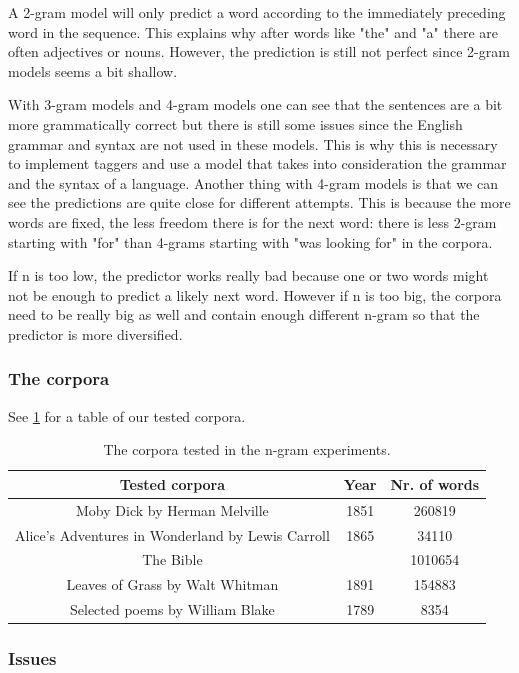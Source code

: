 \documentclass[a4paper,12pt]{article}
\begin{document}
A 2-gram model will only predict a word according to the immediately preceding word in the sequence. This explains why after words like "the" and "a" there are often adjectives or nouns. However, the prediction is still not perfect since 2-gram models seems a bit shallow.

With 3-gram models and 4-gram models one can see that the sentences are a bit more grammatically correct but there is still some issues since the English grammar and syntax are not used in these models. This is why this is necessary to implement taggers and use a model that takes into consideration the grammar and the syntax of a language. Another thing with 4-gram models is that we can see the predictions are quite close for different attempts. This is because the more words are fixed, the less freedom there is for the next word: there is less 2-gram starting with "for" than 4-grams starting with "was looking for" in the corpora.
	
If n is too low, the predictor works really bad because one or two words might not be enough to predict a likely next word. However if n is too big, the corpora need to be really big as well and contain enough different n-gram so that the predictor is more diversified.

\subsubsection{The corpora}
See \ref{tab:corpora1} for a table of our tested corpora.
\begin{table}
\begin{center}
\begin{tabular}{|c|c|c|}
\hline
Tested corpora & Year & Nr. of words \\ \hline
Moby Dick by Herman Melville & 1851 & 260819\\ \hline
Alice's Adventures in Wonderland by Lewis Carroll & 1865 & 34110 \\ \hline
The Bible & & 1010654 \\ \hline
Leaves of Grass by Walt Whitman & 1891 & 154883\\ \hline
Selected poems by William Blake & 1789 & 8354 \\ \hline
\end{tabular}
\caption{The corpora tested in the n-gram experiments.}
\label{tab:corpora1}
\end{center}
\end{table}

\subsubsection{Issues}
\end{document}
